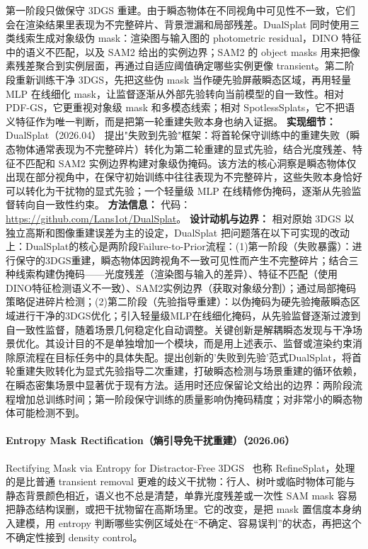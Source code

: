 第一阶段只做保守 3DGS 重建。由于瞬态物体在不同视角中可见性不一致，它们会在渲染结果里表现为不完整碎片、背景泄漏和局部残差。DualSplat 同时使用三类线索生成对象级伪 mask：渲染图与输入图的 photometric residual，DINO 特征中的语义不匹配，以及 SAM2 给出的实例边界；SAM2 的 object masks 用来把像素残差聚合到实例层面，再通过自适应阈值确定哪些实例更像 transient。第二阶段重新训练干净 3DGS，先把这些伪 mask 当作硬先验屏蔽瞬态区域，再用轻量 MLP 在线细化 mask，让监督逐渐从外部先验转向当前模型的自一致性。相对 PDF-GS，它更重视对象级 mask 和多模态线索；相对 SpotlessSplats，它不把语义特征作为唯一判断，而是把第一轮重建失败本身也纳入证据。
\textbf{实现细节：} DualSplat（2026.04） 提出"失败到先验"框架：将首轮保守训练中的重建失败（瞬态物体通常表现为不完整碎片）转化为第二轮重建的显式先验，结合光度残差、特征不匹配和 SAM2 实例边界构建对象级伪掩码。该方法的核心洞察是瞬态物体仅出现在部分视角中，在保守初始训练中往往表现为不完整碎片，这些失败本身恰好可以转化为干扰物的显式先验；一个轻量级 MLP 在线精修伪掩码，逐渐从先验监督转向自一致性约束。
\textbf{方法信息：} 代码：\url{https://github.com/Lans1ot/DualSplat}。
\textbf{设计动机与边界：} 相对原始 3DGS 以独立高斯和图像重建误差为主的设定，DualSplat 把问题落在以下可实现的改动上：DualSplat的核心是两阶段Failure-to-Prior流程：(1)第一阶段（失败暴露）：进行保守的3DGS重建，瞬态物体因跨视角不一致可见性而产生不完整碎片；结合三种线索构建伪掩码——光度残差（渲染图与输入的差异）、特征不匹配（使用DINO特征检测语义不一致）、SAM2实例边界（获取对象级分割）；通过局部掩码策略促进碎片检测；(2)第二阶段（先验指导重建）：以伪掩码为硬先验掩蔽瞬态区域进行干净的3DGS优化；引入轻量级MLP在线细化掩码，从先验监督逐渐过渡到自一致性监督，随着场景几何稳定化自动调整。关键创新是解耦瞬态发现与干净场景优化。其设计目的不是单独增加一个模块，而是用上述表示、监督或渲染约束消除原流程在目标任务中的具体失配。提出创新的'失败到先验'范式DualSplat，将首轮重建失败转化为显式先验指导二次重建，打破瞬态检测与场景重建的循环依赖，在瞬态密集场景中显著优于现有方法。适用时还应保留论文给出的边界：两阶段流程增加总训练时间；第一阶段保守训练的质量影响伪掩码精度；对非常小的瞬态物体可能检测不到。
\paragraph{Entropy Mask Rectification（熵引导免干扰重建）（2026.06）}
Rectifying Mask via Entropy for Distractor-Free 3DGS~\cite{2606_29496} 也称 RefineSplat，处理的是比普通 transient removal 更难的歧义干扰物：行人、树叶或临时物体可能与静态背景颜色相近，语义也不总是清楚，单靠光度残差或一次性 SAM mask 容易把静态结构误删，或把干扰物留在高斯场里。它的改变，是把 mask 置信度本身纳入建模，用 entropy 判断哪些实例区域处在“不确定、容易误判”的状态，再把这个不确定性接到 density control。

